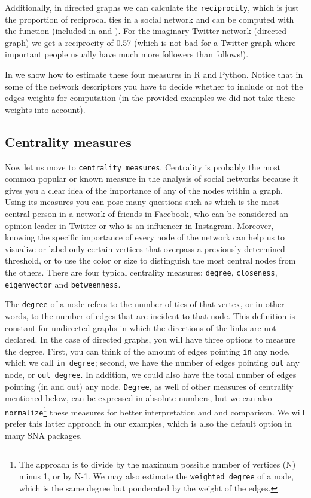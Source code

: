 Additionally, in directed graphs we can calculate the \texttt{reciprocity}, which is just the proportion of reciprocal ties in a social network and can be computed with the function  (included in  and ). For the imaginary Twitter network (directed graph) we get a reciprocity of 0.57 (which is not bad for a Twitter graph where important people usually have much more followers than follows!).

In  we show how to estimate these four measures in R and Python. Notice that in some of the network descriptors you have to decide whether to include or not the edges weights for computation (in the provided examples we did not take these weights into account).


\subsection{Centrality measures}

Now let us move to \texttt{centrality measures}. Centrality is probably the most common popular or known measure in the analysis of social networks because it gives you a clear idea of the importance of any of the nodes within a graph. Using its measures you can pose many questions such as which is the most central person in a network of friends in Facebook, who can be considered an opinion leader in Twitter or who is an influencer in Instagram. Moreover, knowing the specific importance of every node of the network can help us to visualize or label only certain vertices that overpass a previously determined threshold, or to use the color or size to distinguish the most central nodes from the others. There are four typical centrality measures: \texttt{degree}, \texttt{closeness}, \texttt{eigenvector} and \texttt{betweenness}.

The \texttt{degree} of a node refers to the number of ties of that vertex, or in other words, to the number of edges that are incident to that node. This definition is constant for undirected graphs in which the directions of the links are not declared. In the case of directed graphs, you will have three options to measure the degree. First, you can think of the amount of edges pointing \texttt{in} any node, which we call \texttt{in degree}; second, we have the number of edges pointing \texttt{out} any node, or \texttt{out degree}. In addition, we could also have the total number of edges pointing (in and out) any node. \texttt{Degree}, as well of other measures of centrality mentioned below, can be expressed in absolute numbers, but we can also \texttt{normalize}\footnote{The approach is to divide by the maximum possible number of vertices (N) minus 1, or by N-1. We may also estimate the \texttt{weighted degree} of a node, which is the same degree but ponderated by the weight of the edges.}  these measures for better interpretation and and comparison. We will prefer this latter approach in our examples, which is also the default option in many SNA packages.

